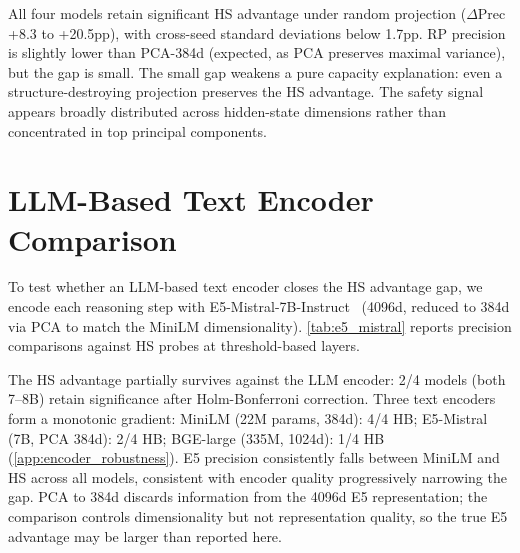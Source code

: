 All four models retain significant HS advantage under random projection ($\Delta$Prec +8.3 to +20.5pp), with cross-seed standard deviations below 1.7pp. RP precision is slightly lower than PCA-384d (expected, as PCA preserves maximal variance), but the gap is small. The small gap weakens a pure capacity explanation: even a structure-destroying projection preserves the HS advantage. The safety signal appears broadly distributed across hidden-state dimensions rather than concentrated in top principal components.


\section{LLM-Based Text Encoder Comparison}
\label{app:e5_mistral}

To test whether an LLM-based text encoder closes the HS advantage gap, we encode each reasoning step with E5-Mistral-7B-Instruct~\citep{wang2024e5mistral} (4096d, reduced to 384d via PCA to match the MiniLM dimensionality). \cref{tab:e5_mistral} reports precision comparisons against HS probes at threshold-based layers.

\begin{table}[htbp]
\centering
\small
\caption{HS vs.\ E5-Mistral-7B (PCA 384d) precision. HB: Holm-Bonferroni adjusted (4 tests, $\alpha{=}0.05$). MiniLM precision from \cref{tab:hs_vs_text} for reference. 60/20/20 split.}
\label{tab:e5_mistral}
\end{table}

The HS advantage partially survives against the LLM encoder: 2/4 models (both 7--8B) retain significance after Holm-Bonferroni correction. Three text encoders form a monotonic gradient: MiniLM (22M params, 384d): 4/4 HB; E5-Mistral (7B, PCA 384d): 2/4 HB; BGE-large (335M, 1024d): 1/4 HB (\cref{app:encoder_robustness}). E5 precision consistently falls between MiniLM and HS across all models, consistent with encoder quality progressively narrowing the gap. PCA to 384d discards information from the 4096d E5 representation; the comparison controls dimensionality but not representation quality, so the true E5 advantage may be larger than reported here.


